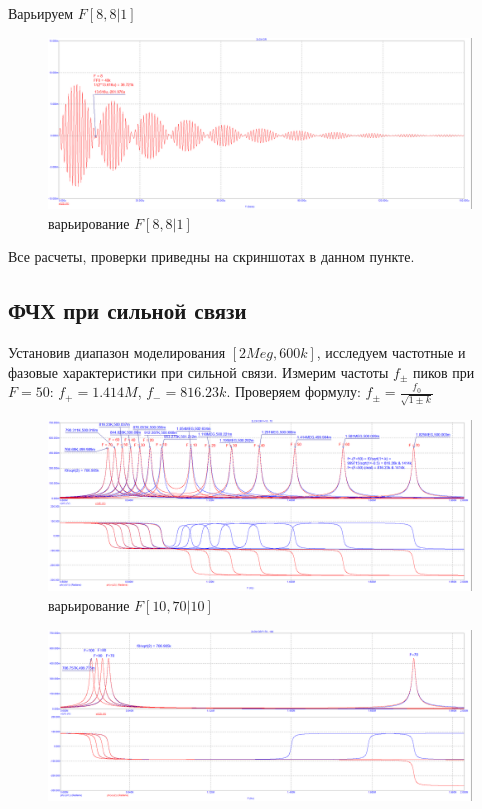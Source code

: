 \documentclass[a4paper, 14pt]{extarticle}%
\begin{document}
Варьируем $F [8, 8|1]$

\begin{figure}[h!]
	\centering
			\includegraphics[width=1.1\linewidth]{908_work/10_3_f8.png}
            \caption{варьирование $F [8, 8|1]$}
	\label{A}
\end{figure}

Все расчеты, проверки приведны на скриншотах в данном пункте.

\subsection{ФЧХ при сильной связи}

Установив диапазон моделирования $[2Meg, 600k]$, исследуем частотные и фазовые характеристики при сильной связи. 
\newline
Измерим частоты $f_{\pm}$ пиков при $F = 50$: $f_{+} = 1.414M$, $f_{-} = 816.23k$.
\newline
Проверяем формулу: $f_{\pm} = \frac{f_0}{\sqrt{1 \pm k}}$

\begin{figure}[h!]
	\centering
			\includegraphics[width=1.1\linewidth]{908_work/11_1.png}
            \caption{варьирование $F  [10, 70|10]$}
	\label{A}
\end{figure}


\begin{figure}[h!]
	\centering
			\includegraphics[width=1.1\linewidth]{908_work/11_2.png}
	\label{A}
\end{figure}
\end{document}
